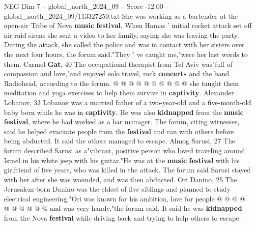 \begin{textsample}{NEG Dim 7 – global\_north\_2024\_09 – Score -12.00 – global\_north\_2024\_09/113327250.txt}
She was working as a bartender at the open-air Tribe of Nova \textbf{music} \textbf{festival}.
When Hamas ' initial rocket attack set off air raid sirens she sent a video to her family, saying she was leaving the party.
During the attack, she called the police and was in contact with her sisters over the next four hours, the forum said."They ' ve caught me,"were her last words to them.
Carmel \textbf{Gat}, 40 The occupational therapist from Tel Aviv was"full of compassion and love,"and enjoyed solo travel, rock \textbf{concerts} and the band Radiohead, according to the forum. @ @ @ @ @ @ @ @ @ @ she taught them meditation and yoga exercises to help them survive in \textbf{captivity}.
Alexander Lobanov, 33 Lobanov was a married father of a two-year-old and a five-month-old baby born while he was in \textbf{captivity}.
He was also \textbf{kidnapped} from the \textbf{music} \textbf{festival}, where he had worked as a bar manager.
The forum, citing witnesses, said he helped evacuate people from the \textbf{festival} and ran with others before being abducted.
It said the others managed to escape.
Almog Sarusi, 27 The forum described Sarusi as a"vibrant, positive person who loved traveling around Israel in his white jeep with his guitar."He was at the \textbf{music} \textbf{festival} with his girlfriend of five years, who was killed in the attack.
The forum said Sarusi stayed with her after she was wounded, and was then abducted.
Ori Danino, 25 The Jerusalem-born Danino was the eldest of five siblings and planned to study electrical engineering."Ori was known for his ambition, love for people @ @ @ @ @ @ @ @ @ @ and was very handy,"the forum said.
It said he was \textbf{kidnapped} from the Nova \textbf{festival} while driving back and trying to help others to escape.

\end{textsample}
